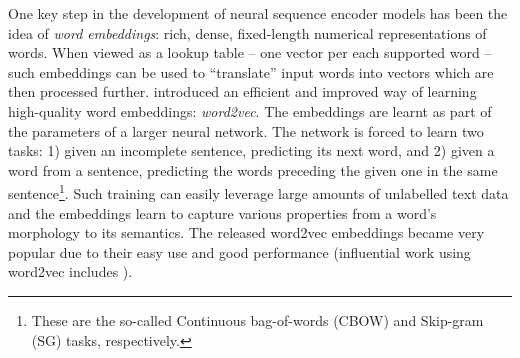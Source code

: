 \documentclass[bsc,frontabs,singlespacing,parskip,deptreport]{infthesis}
\begin{document}
{{    One key step in the development of neural sequence encoder models has been the idea of \textit{word embeddings}: rich, dense, fixed-length numerical representations of words. When viewed as a lookup table -- one vector per each supported word -- such embeddings can be used to ``translate'' input words into vectors which are then processed further.
    \citet{Mikolov_2013} introduced an efficient and improved way of learning high-quality word embeddings: \textit{word2vec}. The embeddings are learnt as part of the parameters of a larger neural network. The network is forced to learn two tasks: 1) given an incomplete sentence, predicting its next word, and 2) given a word from a sentence, predicting the words preceding the given one in the same sentence\footnote{These are the so-called Continuous bag-of-words (CBOW) and Skip-gram (SG) tasks, respectively.}. Such training can easily leverage large amounts of unlabelled text data and the embeddings learn to capture various properties from a word's morphology to its semantics. The released word2vec embeddings became very popular due to their easy use and good performance (influential work using word2vec includes \citet{Lample_2016,Kiros_2015,Dos_2014,Kusner_2015}).

}}
\end{document}
